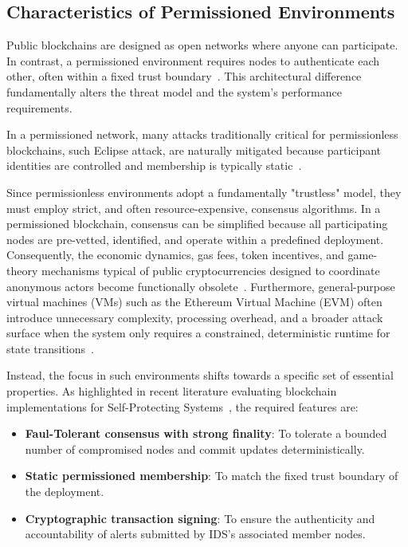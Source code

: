 \subsection{Characteristics of Permissioned Environments}
Public blockchains are designed as open networks where anyone can participate. In contrast, a permissioned environment requires nodes to authenticate each other, often within a fixed trust boundary~\cite{wang2022bft}. This architectural difference fundamentally alters the threat model and the system's performance requirements.

In a permissioned network, many attacks traditionally critical for permissionless blockchains, such Eclipse attack, are naturally mitigated because participant identities are controlled and membership is typically static~\cite{albero2026blockchain}.

Since permissionless environments adopt a fundamentally "trustless" model, they must employ strict, and often resource-expensive, consensus algorithms. In a permissioned blockchain, consensus can be simplified because all participating nodes are pre-vetted, identified, and operate within a predefined deployment. Consequently, the economic dynamics, gas fees, token incentives, and game-theory mechanisms typical of public cryptocurrencies designed to coordinate anonymous actors become functionally obsolete~\cite{albero2026blockchain}. Furthermore, general-purpose virtual machines (VMs) such as the Ethereum Virtual Machine (EVM) often introduce unnecessary complexity, processing overhead, and a broader attack surface when the system only requires a constrained, deterministic runtime for state transitions~\cite{albero2026blockchain}.

Instead, the focus in such environments shifts towards a specific set of essential properties. As highlighted in recent literature evaluating blockchain implementations for Self-Protecting Systems~\cite{albero2026blockchain}, the required features are:
\begin{itemize}
    \item \textbf{ Faul-Tolerant consensus with strong finality}: To tolerate a bounded number of compromised nodes and commit updates deterministically.
    \item \textbf{Static permissioned membership}: To match the fixed trust boundary of the deployment.
    \item \textbf{Cryptographic transaction signing}: To ensure the authenticity and accountability of alerts submitted by IDS's associated member nodes.
\end{itemize}

